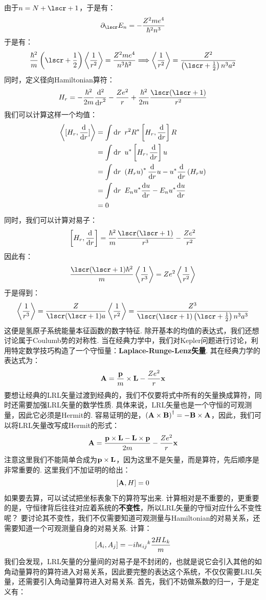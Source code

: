 由于\(n=N+\lscr+1\)，于是有：
\[
\partial_{\lscr}E_{n} = -\frac{Z^{2}me^{4}}{\hh^{2}n^{3}}
\]
于是有：
\[
\frac{\hh^{2}}{m}\br{\lscr+\frac{1}{2}}\avg{\frac{1}{r^{2}}} = \frac{Z^{2}me^{4}}{n^{3}\hh^{2}} \Longrightarrow \avg{\frac{1}{r^{2}}} = \frac{Z^{2}}{\br{\lscr+\frac{1}{2}}n^{3}a^{2}}
\]
同时，定义径向Hamiltonian算符：
\[
H_{r} = -\frac{\hh^{2}}{2m}\dde{}{r} - \frac{Ze^{2}}{r} + \frac{\hh^{2}}{2m}\frac{\lscr(\lscr+1)}{r^{2}}
\]
我们可以计算这样一个均值：
\begin{align*}
\left\langle{[H_{r},\frac{\dd{}}{\dd{r}}]}\right\rangle 
& = \int\dd{r}\ r^{2}R^{*}\left[{H_{r},\frac{\dd{}}{\dd{r}}}\right]R \\
& = \int\dd{r}\ u^{*}\left[{H_{r},\frac{\dd{}}{\dd{r}}}\right]u \\
& = \int\dd{r}\ \left({H_{r}u}\right)^{*}\frac{\dd{}}{\dd{r}}u - u^{*}\frac{\dd{}}{\dd{r}}\left({H_{r}u}\right) \\
& = \int\dd{r}\ E_{n}u^{*}\frac{\dd{u}}{\dd{r}} - E_{n}u^{*}\frac{\dd{u}}{\dd{r}} \\
& = 0
\end{align*}
同时，我们可以计算对易子：
\[
\mbr{H_{r},\de{}{r}} = \frac{\hh^{2}}{m}\frac{\lscr(\lscr+1)}{r^{3}} - \frac{Ze^{2}}{r^{2}}
\]
因此有：
\[
\frac{\lscr(\lscr+1)\hh^{2}}{m}\avg{\frac{1}{r^{3}}} = Ze^{2}\avg{\frac{1}{r^{2}}}
\]
于是得到：
\[
\avg{\frac{1}{r^{3}}} = \frac{Z}{\lscr(\lscr+1)a}\avg{\frac{1}{r^{2}}} = \frac{Z^{3}}{\lscr(\lscr+1)\br{\lscr+\frac{1}{2}}n^{3}a^{3}}
\]
这便是氢原子系统能量本征函数的数字特征. 除开基本的均值的表达式，我们还想讨论属于Coulumb势的对称性. 当在经典力学中，我们对Kepler问题进行讨论，利用特定数学技巧构造了一个守恒量：\textbf{Laplace-Runge-Lenz矢量}. 其在经典力学的表达式为：
\[
\mathbf{A} = \frac{\mathbf{p}}{m}\times\mathbf{L} - \frac{Ze^{2}}{r}\mathbf{x}
\]
要想让经典的LRL矢量过渡到经典的，我们不仅要将式中所有的矢量换成算符，同时还需要加强LRL矢量的数学性质. 具体来说，LRL矢量也是一个守恒的可观测量，因此它必须是Hermit的. 
容易证明的是，\(\left({\mathbf{A}\times\mathbf{B}}\right)^{\dagger} = -\mathbf{B}\times\mathbf{A}\)，因此，我们可以将LRL矢量改写成Hermit的形式：
\[
\mathbf{A} = \frac{\mathbf{p}\times\mathbf{L} - \mathbf{L}\times\mathbf{p}}{2m} - \frac{Ze^{2}}{r}\mathbf{x}
\]
注意这里我们不能简单合成为\(\mathbf{p}\times\mathbf{L}\)，因为这里不是矢量，而是算符，先后顺序是非常重要的. 这里我们不加证明的给出：
\[
[\mathbf{A},H] = 0
\]
如果要去算，可以试试把坐标表象下的算符写出来. 计算相对是不重要的，更重要的是，守恒律背后往往对应着系统的\textbf{不变性}，所以LRL矢量的守恒对应什么不变性呢？
要讨论其不变性，我们不仅需要知道可观测量与Hamiltonian的对易关系，还需要知道一个可观测量自身的对易关系. 计算：
\[
[A_{i},A_{j}] = -i\hbar{\epsilon_{ij}}^{k}\frac{2HL_{k}}{m}
\]
我们会发现，LRL矢量的分量间的对易子是不封闭的，也就是说它会引入其他的如角动量算符的算符进入对易关系，因此要完整的表达这个系统，不仅仅需要LRL矢量，还需要引入角动量算符进入对易关系. 首先，我们不妨做系数的归一，于是定义有：
